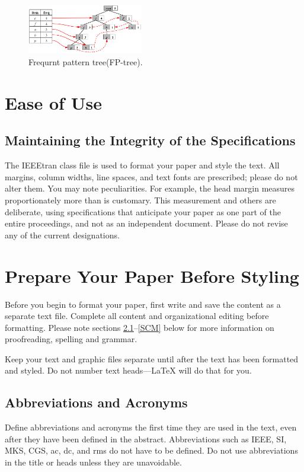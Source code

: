 \documentclass[conference]{IEEEtran}
\begin{document}
\begin{figure}[htbp]
\centerline{\includegraphics[width=0.45\textwidth]{fptree.png}}
\caption{Frequrnt pattern tree(FP-tree).}
\label{fptree}
\end{figure}

\section{Ease of Use}

\subsection{Maintaining the Integrity of the Specifications}

The IEEEtran class file is used to format your paper and style the text. All margins, 
column widths, line spaces, and text fonts are prescribed; please do not 
alter them. You may note peculiarities. For example, the head margin
measures proportionately more than is customary. This measurement 
and others are deliberate, using specifications that anticipate your paper 
as one part of the entire proceedings, and not as an independent document. 
Please do not revise any of the current designations.

\section{Prepare Your Paper Before Styling}
Before you begin to format your paper, first write and save the content as a 
separate text file. Complete all content and organizational editing before 
formatting. Please note sections \ref{AA}--\ref{SCM} below for more information on 
proofreading, spelling and grammar.

Keep your text and graphic files separate until after the text has been 
formatted and styled. Do not number text heads---{\LaTeX} will do that 
for you.

\subsection{Abbreviations and Acronyms}\label{AA}
Define abbreviations and acronyms the first time they are used in the text, 
even after they have been defined in the abstract. Abbreviations such as 
IEEE, SI, MKS, CGS, ac, dc, and rms do not have to be defined. Do not use 
abbreviations in the title or heads unless they are unavoidable.
\end{document}
